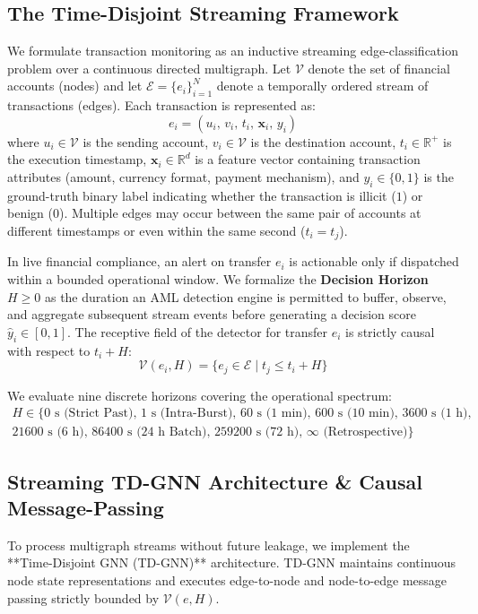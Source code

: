 \documentclass[11pt,a4paper]{article}
\begin{document}
\subsection{The Time-Disjoint Streaming Framework}
We formulate transaction monitoring as an inductive streaming edge-classification problem over a continuous directed multigraph. Let $\mathcal{V}$ denote the set of financial accounts (nodes) and let $\mathcal{E}=\{e_i\}_{i=1}^N$ denote a temporally ordered stream of transactions (edges). Each transaction is represented as:
\begin{equation}
e_i = (u_i, \, v_i, \, t_i, \, \mathbf{x}_i, \, y_i)
\end{equation}
where $u_i \in \mathcal{V}$ is the sending account, $v_i \in \mathcal{V}$ is the destination account, $t_i \in \mathbb{R}^+$ is the execution timestamp, $\mathbf{x}_i \in \mathbb{R}^d$ is a feature vector containing transaction attributes (amount, currency format, payment mechanism), and $y_i \in \{0,1\}$ is the ground-truth binary label indicating whether the transaction is illicit ($1$) or benign ($0$). Multiple edges may occur between the same pair of accounts at different timestamps or even within the same second ($t_i = t_j$).

In live financial compliance, an alert on transfer $e_i$ is actionable only if dispatched within a bounded operational window. We formalize the \textbf{Decision Horizon $H \ge 0$} as the duration an AML detection engine is permitted to buffer, observe, and aggregate subsequent stream events before generating a decision score $\hat{y}_i \in [0, 1]$. The receptive field of the detector for transfer $e_i$ is strictly causal with respect to $t_i + H$:
\begin{equation}
\mathcal{V}(e_i, H) = \{e_j \in \mathcal{E} \mid t_j \le t_i + H\}
\end{equation}

We evaluate nine discrete horizons covering the operational spectrum:
\begin{multline}
H \in \{0\text{ s (Strict Past)}, \, 1\text{ s (Intra-Burst)}, \, 60\text{ s (1 min)}, \, 600\text{ s (10 min)}, \, 3600\text{ s (1 h)}, \\
        21600\text{ s (6 h)}, \, 86400\text{ s (24 h Batch)}, \, 259200\text{ s (72 h)}, \, \infty\text{ (Retrospective)}\}
\end{multline}

\subsection{Streaming TD-GNN Architecture \& Causal Message-Passing}
To process multigraph streams without future leakage, we implement the **Time-Disjoint GNN (TD-GNN)** architecture. TD-GNN maintains continuous node state representations and executes edge-to-node and node-to-edge message passing strictly bounded by $\mathcal{V}(e, H)$. 
\end{document}
